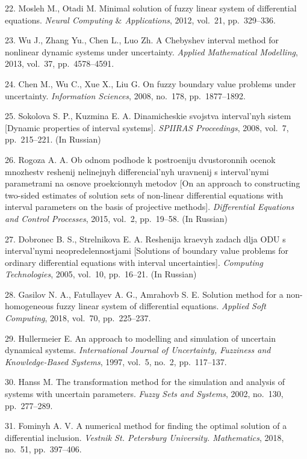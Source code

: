{%
22. Mosleh M., Otadi M. Minimal solution of fuzzy linear system of differential equations. \emph{Neural Computing $\&$ Applications}, 2012, vol.~21, pp.~329--336.

23. Wu J., Zhang Yu., Chen L., Luo Zh. A Chebyshev interval method for nonlinear dynamic systems under uncertainty. \emph{Applied Mathematical Modelling}, 2013, vol.~37, pp.~4578--4591.

24. Chen M., Wu C., Xue X., Liu G. On fuzzy boundary value problems under uncertainty. \emph{Information Sciences}, 2008, no.~178, pp.~1877--1892.

25. Sokolova S. P., Kuzmina E. A. Dinamicheskie svojstva interval'nyh sistem [Dynamic properties of interval systems]. \emph{SPIIRAS Proceedings}, 2008, vol.~7, pp.~215--221. (In Russian)

26. Rogoza A. A. Ob odnom podhode k postroeniju dvustoronnih ocenok mnozhestv reshenij nelinejnyh differencial'nyh uravnenij s interval'nymi parametrami na osnove proekcionnyh metodov [On an approach to constructing two-sided estimates of solution sets of non-linear differential equations with interval parameters on the basis of projective methods]. \emph{Differential Equations and Control Processes}, 2015, vol.~2, pp.~19--58. (In Russian)

27. Dobronec B. S., Strelnikova E. A. Reshenija kraevyh zadach dlja ODU s interval'nymi neo\-pre\-de\-lennostjami [Solutions of boundary value problems for ordinary differential equations with interval un\-cer\-tain\-ties]. \emph{Computing Technologies}, 2005, vol.~10, pp.~16--21. (In Russian)

28. Gasilov N. A., Fatullayev A. G., Amrahovb S. E. Solution method for a non-homogeneous fuzzy linear system of differential equations. \emph{Applied Soft Computing}, 2018, vol.~70, pp.~225--237.

29. Hullermeier E. An approach to modelling and simulation of uncertain dynamical systems. \emph{International Journal of Uncertainty, Fuzziness and Knowledge-Based Systems}, 1997, vol.~5, no.~2, pp.~117--137.

30. Hanss M. The transformation method for the simulation and analysis of systems with uncertain parameters. \emph{Fuzzy Sets and Systems}, 2002, no.~130, pp.~277--289.

31. Fominyh A. V. A numerical method for finding the optimal solution of a differential inclusion. \emph{Vestnik St. Petersburg University. Mathematics}, 2018, no.~51, pp.~397--406.

}
